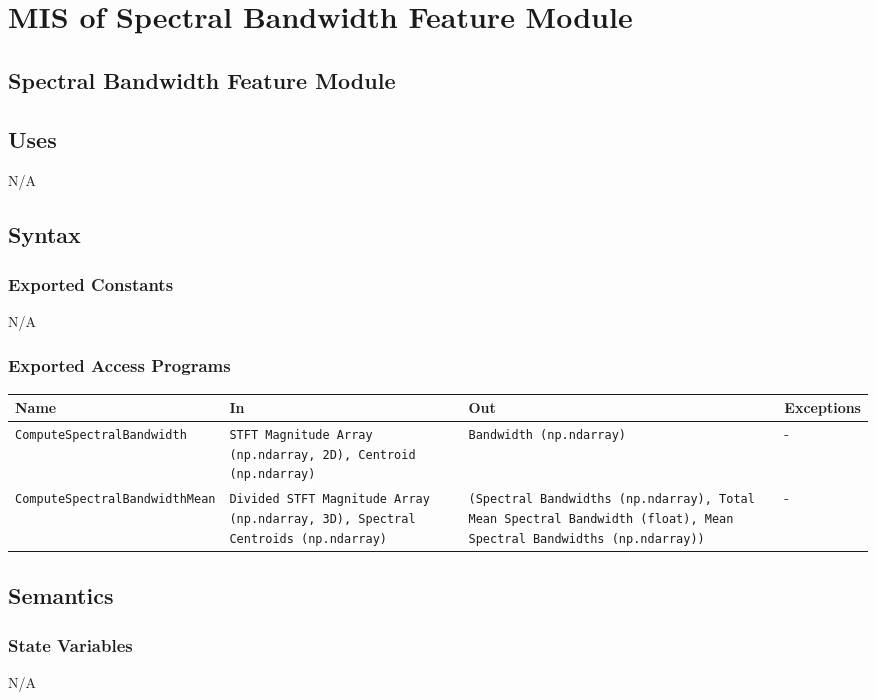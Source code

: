 \documentclass[12pt, titlepage]{article}
\begin{document}
{\color{red}
\section{MIS of Spectral Bandwidth Feature Module}

\subsection{Spectral Bandwidth Feature Module}

\subsection{Uses}
N/A

\subsection{Syntax}

\subsubsection{Exported Constants}
N/A

\subsubsection{Exported Access Programs}

\begin{center}
  \begin{tabular}{|p{6cm}|p{4cm}|p{3cm}|p{2cm}|}
  \hline
  \textbf{Name} & \textbf{In} & \textbf{Out} & \textbf{Exceptions} \\
  \hline
  \texttt{ComputeSpectralBandwidth} & \texttt{STFT Magnitude Array (np.ndarray, 2D), Centroid (np.ndarray)} & \texttt{Bandwidth (np.ndarray)} & - \\
  \hline
  \texttt{ComputeSpectralBandwidthMean} & \texttt{Divided STFT Magnitude Array (np.ndarray, 3D), Spectral Centroids (np.ndarray)} & \texttt{(Spectral Bandwidths (np.ndarray), Total Mean Spectral Bandwidth (float), Mean Spectral Bandwidths (np.ndarray))} & - \\
  \hline
  \end{tabular}
\end{center}

\subsection{Semantics}

\subsubsection{State Variables}
N/A

}
\end{document}

